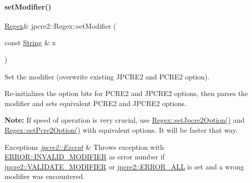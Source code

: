 \paragraph{\texorpdfstring{set\+Modifier()}{setModifier()}}
{\footnotesize\ttfamily \hyperlink{classjpcre2_1_1Regex}{Regex}\& jpcre2\+::\+Regex\+::set\+Modifier (\begin{DoxyParamCaption}\item[{const \hyperlink{namespacejpcre2_a91f03070152fb228bc116c5a737f1d16}{String} \&}]{x }\end{DoxyParamCaption})\hspace{0.3cm}{\ttfamily [inline]}}



Set the modifier (overwrite existing J\+P\+C\+R\+E2 and P\+C\+R\+E2 option). 

Re-\/initializes the option bits for P\+C\+R\+E2 and J\+P\+C\+R\+E2 options, then parses the modifier and sets equivalent P\+C\+R\+E2 and J\+P\+C\+R\+E2 options.

{\bfseries Note\+:} If speed of operation is very crucial, use \hyperlink{classjpcre2_1_1Regex_a031617a19638ef752dcd2b29fa3464d5_a031617a19638ef752dcd2b29fa3464d5}{Regex\+::set\+Jpcre2\+Option()} and \hyperlink{classjpcre2_1_1Regex_acdc6f97f4030ae109c4e1a4e2310bceb_acdc6f97f4030ae109c4e1a4e2310bceb}{Regex\+::set\+Pcre2\+Option()} with equivalent options. It will be faster that way. 
\begin{DoxyExceptions}{Exceptions}
{\em \hyperlink{classjpcre2_1_1Except}{jpcre2\+::\+Except}} & Throws exception with \hyperlink{namespacejpcre2_1_1ERROR_a4b2998984439438fa9da8d7043909bc2_a4b2998984439438fa9da8d7043909bc2a4115340549b623f4e2da285bf0aa9bff}{E\+R\+R\+O\+R\+::\+I\+N\+V\+A\+L\+I\+D\+\_\+\+M\+O\+D\+I\+F\+I\+ER} as error number if \hyperlink{namespacejpcre2_a85c143271501e383843f45b9999c2f00_a85c143271501e383843f45b9999c2f00a9124b768bcae4d51430aa7f26126f387}{jpcre2\+::\+V\+A\+L\+I\+D\+A\+T\+E\+\_\+\+M\+O\+D\+I\+F\+I\+ER} or \hyperlink{namespacejpcre2_a85c143271501e383843f45b9999c2f00_a85c143271501e383843f45b9999c2f00a6fec35fc9fdd8a606bed430c1816c552}{jpcre2\+::\+E\+R\+R\+O\+R\+\_\+\+A\+LL} is set and a wrong modifier was encountered. \\
\hline
\end{DoxyExceptions}

